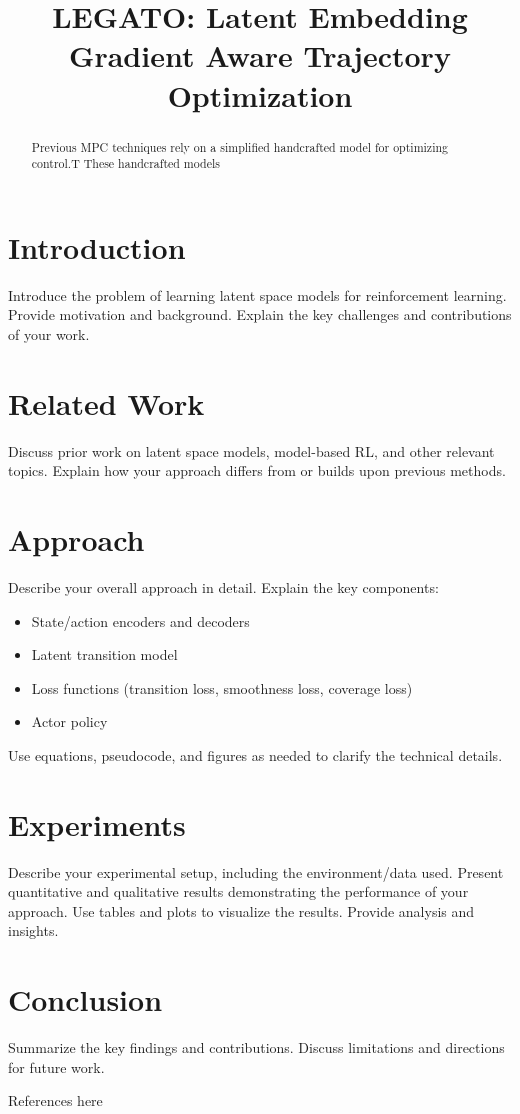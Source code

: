 \documentclass[12pt, twocolumn]{article}
\begin{document}
\title{LEGATO: Latent Embedding Gradient Aware Trajectory Optimization}
\maketitle
\begin{abstract}
Previous MPC techniques rely on a simplified handcrafted model for optimizing control.T
These handcrafted models 
\end{abstract}
\section{Introduction}
Introduce the problem of learning latent space models for reinforcement learning. Provide motivation and background. Explain the key challenges and contributions of your work.
\section{Related Work}
Discuss prior work on latent space models, model-based RL, and other relevant topics. Explain how your approach differs from or builds upon previous methods.
\section{Approach}
Describe your overall approach in detail. Explain the key components:
\begin{itemize}
    \item State/action encoders and decoders
    \item Latent transition model
    \item Loss functions (transition loss, smoothness loss, coverage loss)
    \item Actor policy
\end{itemize}
Use equations, pseudocode, and figures as needed to clarify the technical details.
\section{Experiments}
Describe your experimental setup, including the environment/data used. Present quantitative and qualitative results demonstrating the performance of your approach. Use tables and plots to visualize the results. Provide analysis and insights.
\section{Conclusion}
Summarize the key findings and contributions. Discuss limitations and directions for future work.
\begin{thebibliography}{99}
    \bibitem{} References here
\end{thebibliography}
\appendix
\end{document}
